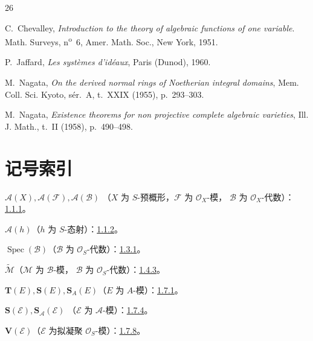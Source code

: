 \documentclass[UTF8,fontset=none,11pt,oneside,openany]{ctexbook}
\providecommand{\Spec}{\operatorname{Spec}}
\newcommand{\oldpage}[2][]{%
  \hypertarget{ega-source-page-#1-#2}{}%
  \marginnote{\scriptsize\textbf{#1}~|~#2}\ignorespaces}
\begin{document}
\begin{thebibliography}{26}
{}

\oldpage[II]{205}
C.~Chevalley,
\emph{Introduction to the theory of algebraic functions of one variable}.
Math. Surveys, n\textsuperscript{o}~6, Amer. Math. Soc., New York, 1951.

P.~Jaffard,
\emph{Les systèmes d'idéaux}, Paris (Dunod), 1960.

M.~Nagata,
\emph{On the derived normal rings of Noetherian integral domains},
Mem. Coll. Sci. Kyoto, sér.~A, t.~XXIX (1955), p.~293--303.

M.~Nagata,
\emph{Existence theorems for non projective complete algebraic varieties},
Ill. J. Math., t.~II (1958), p.~490--498.

\end{thebibliography}
\clearpage
\oldpage[II]{207}
{}
\section*{记号索引}
\thispagestyle{plain}

\begingroup
\small
\setlength{\parindent}{0pt}
\setlength{\parskip}{2pt}
\newcommand{\egaShProj}{\mathcal{P}\!\operatorname{roj}}

$\mathcal{A}(X),\mathcal{A}(\mathcal{F}),\mathcal{A}(\mathcal{B})$
（$X$ 为 $S$-预概形，$\mathcal{F}$ 为 $\mathcal{O}_X$-模，
$\mathcal{B}$ 为 $\mathcal{O}_X$-代数）：\hyperref[II.1.1.1-zh]{1.1.1}。

$\mathcal{A}(h)$（$h$ 为 $S$-态射）：\hyperref[II.1.1.2-zh]{1.1.2}。

$\Spec(\mathcal{B})$（$\mathcal{B}$ 为 $\mathcal{O}_S$-代数）：\hyperref[II.1.3.1-zh]{1.3.1}。

$\widetilde{\mathcal{M}}$（$\mathcal{M}$ 为 $\mathcal{B}$-模，
$\mathcal{B}$ 为 $\mathcal{O}_S$-代数）：\hyperref[II.1.4.3-zh]{1.4.3}。

$\mathbf{T}(E),\mathbf{S}(E),\mathbf{S}_A(E)$（$E$ 为 $A$-模）：\hyperref[II.1.7.1-zh]{1.7.1}。

$\mathbf{S}(\mathcal{E}),\mathbf{S}_{\mathcal{A}}(\mathcal{E})$
（$\mathcal{E}$ 为 $\mathcal{A}$-模）：\hyperref[II.1.7.4-zh]{1.7.4}。

$\mathbf{V}(\mathcal{E})$（$\mathcal{E}$ 为拟凝聚 $\mathcal{O}_S$-模）：\hyperref[II.1.7.8-zh]{1.7.8}。
\end{document}
